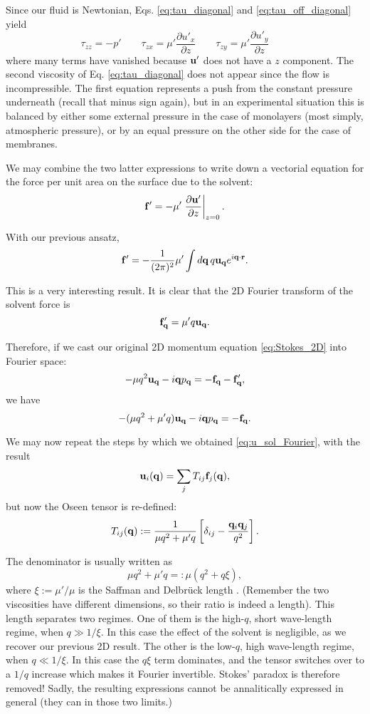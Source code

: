 Since our fluid is Newtonian, Eqs. \ref{eq:tau_diagonal} and
\ref{eq:tau_off_diagonal} yield
\begin{equation*}
  \tau_{zz} = -p'  \qquad
  \tau_{zx} = \mu' \frac{\partial u'_x}{\partial z}  \qquad
  \tau_{zy} = \mu' \frac{\partial u'_y}{\partial z}  \qquad
\end{equation*}
where many terms have vanished because $\mathbf{u}'$ does not have a $z$
component. The second viscosity of Eq. \ref{eq:tau_diagonal} does not
appear since the flow is incompressible. The first equation represents
a push from the constant pressure underneath (recall that minus sign
again), but in an experimental situation this is balanced by either
some external pressure in the case of monolayers (most simply,
atmospheric pressure), or by an equal pressure on the other side for
the case of membranes.

We may combine the two latter expressions to write down a vectorial
equation for the force per unit area on the surface due to the
solvent:
\[
  \mathbf{f}' = - \mu' \left. \frac{\partial \mathbf{u}'}{\partial z} \right|_{z=0} .
\]


With our previous ansatz,
\[
  \mathbf{f}' = - \frac 1{(2\pi)^2} \mu' \int d\mathbf{q} \, q \mathbf{u}_{\mathbf{q}} e^{
    i\mathbf{q}\cdot\mathbf{r}} .
\]

This is a very interesting result. It is clear that the 2D Fourier
transform of the solvent force is
\[
  \mathbf{f}'_{\mathbf{q}} =  \mu' q \mathbf{u}_{\mathbf{q}} .
\]

Therefore, if we cast our original 2D momentum equation
\ref{eq:Stokes_2D} into Fourier space:
\[
-  \mu q^2 \mathbf{u}_{\mathbf{q}} - i \mathbf{q} p_{\mathbf{q}} = -\mathbf{f}_{\mathbf{q}} -\mathbf{f}'_{\mathbf{q}} ,
\]
we have
\[
-  ( \mu q^2 +  \mu' q ) \mathbf{u}_{\mathbf{q}} - i \mathbf{q} p_{\mathbf{q}} = -\mathbf{f}_{\mathbf{q}} .
\]

We may now repeat the steps by which we obtained
\ref{eq:u_sol_Fourier}, with the result
\begin{equation*}
\mathbf{u}_i(\mathbf{q}) =  \sum_j T_{ij} \mathbf{f}_j(\mathbf{q}),
\end{equation*}
%
but now the Oseen tensor is re-defined:
\[
T_{ij}(\mathbf{q}) := \frac 1{\mu q^2 +  \mu' q  } \left[
  \delta_{ij} - \frac{ \mathbf{q}_i  \mathbf{q}_j}{q^2} 
\right].
\]

The denominator is usually written as
\[
  \mu q^2 +  \mu' q =:
  \mu (q^2 +  q \xi ) ,
\]
where $\xi:= \mu'/\mu$ is the Saffman and Delbr{\"u}ck length
. (Remember the two
viscosities have different dimensions, so their ratio is indeed a
length). This length separates two regimes.  One of them is the
high-$q$, short wave-length regime, when $q \gg 1/\xi$. In this case
the effect of the solvent is negligible, as we recover our previous 2D
result. The other is the low-$q$, high wave-length regime, when
$q \ll 1/\xi$. In this case the $q\xi$ term dominates, and the tensor
switches over to a $1/q$ increase which makes it Fourier
invertible. Stokes' paradox is therefore removed! Sadly, the resulting
expressions cannot be annalitically expressed in general (they can in
those two limits.)

